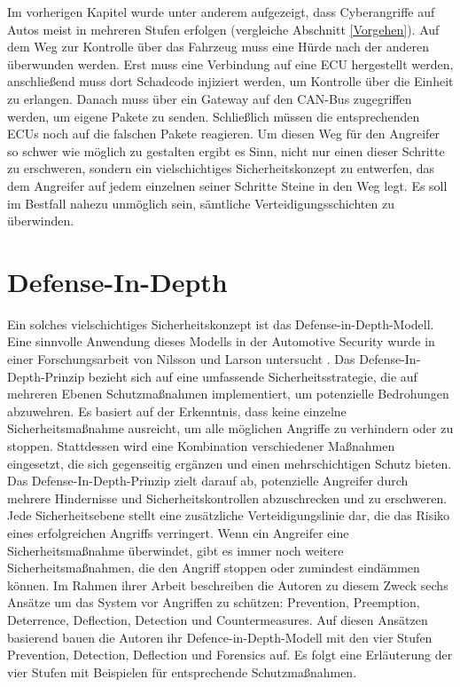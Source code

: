 
Im vorherigen Kapitel wurde unter anderem aufgezeigt, dass Cyberangriffe auf Autos meist in mehreren Stufen erfolgen (vergleiche Abschnitt \ref{Vorgehen}). Auf dem Weg zur Kontrolle über das Fahrzeug muss eine Hürde nach der anderen überwunden werden. Erst muss eine Verbindung auf eine \acs{ECU} hergestellt werden, anschließend muss dort Schadcode injiziert werden, um Kontrolle über die Einheit zu erlangen. Danach muss über ein Gateway auf den \acs{CAN}-Bus zugegriffen werden, um eigene Pakete zu senden. Schließlich müssen die entsprechenden \acsp{ECU} noch auf die falschen Pakete reagieren.
Um diesen Weg für den Angreifer so schwer wie möglich zu gestalten ergibt es Sinn, nicht nur einen dieser Schritte zu erschweren, sondern ein vielschichtiges Sicherheitskonzept zu entwerfen, das dem Angreifer auf jedem einzelnen seiner Schritte Steine in den Weg legt. Es soll im Bestfall nahezu unmöglich sein, sämtliche Verteidigungsschichten zu überwinden.

\section{Defense-In-Depth}
Ein solches vielschichtiges Sicherheitskonzept ist das Defense-in-Depth-Modell. Eine sinnvolle Anwendung dieses Modells in der Automotive Security wurde in einer Forschungsarbeit von Nilsson und Larson untersucht \cite{Nilsson.2009}. 
Das Defense-In-Depth-Prinzip bezieht sich auf eine umfassende Sicherheitsstrategie, die auf mehreren Ebenen Schutzmaßnahmen implementiert, um potenzielle Bedrohungen abzuwehren. Es basiert auf der Erkenntnis, dass keine einzelne Sicherheitsmaßnahme ausreicht, um alle möglichen Angriffe zu verhindern oder zu stoppen. Stattdessen wird eine Kombination verschiedener Maßnahmen eingesetzt, die sich gegenseitig ergänzen und einen mehrschichtigen Schutz bieten.
Das Defense-In-Depth-Prinzip zielt darauf ab, potenzielle Angreifer durch mehrere Hindernisse und Sicherheitskontrollen abzuschrecken und zu erschweren. Jede Sicherheitsebene stellt eine zusätzliche Verteidigungslinie dar, die das Risiko eines erfolgreichen Angriffs verringert. Wenn ein Angreifer eine Sicherheitsmaßnahme überwindet, gibt es immer noch weitere Sicherheitsmaßnahmen, die den Angriff stoppen oder zumindest eindämmen können.
Im Rahmen ihrer Arbeit beschreiben die Autoren zu diesem Zweck sechs Ansätze um das System vor Angriffen zu schützen: Prevention, Preemption, Deterrence, Deflection, Detection und Countermeasures. Auf diesen Ansätzen basierend bauen die Autoren ihr Defence-in-Depth-Modell mit den vier Stufen Prevention, Detection, Deflection und Forensics auf. Es folgt eine Erläuterung der vier Stufen mit Beispielen für entsprechende Schutzmaßnahmen.

